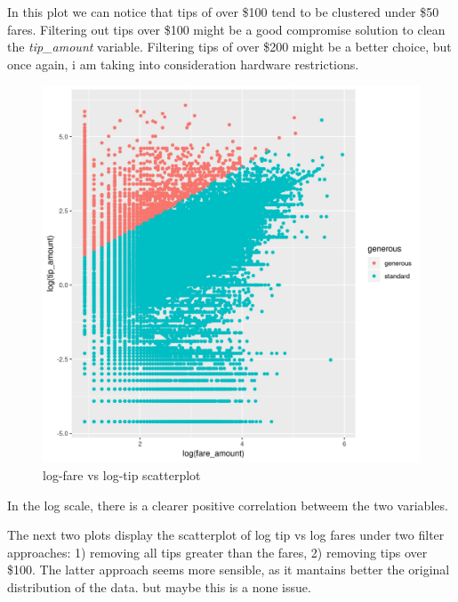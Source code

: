 \documentclass[11pt]{article}
\begin{document}
In this plot we can notice that tips of over \$100 tend to be clustered
under \$50 fares. Filtering out tips over \$100 might be a good compromise
solution to clean the \emph{tip\_amount} variable. Filtering tips of over \$200
might be a better choice, but once again, i am taking into consideration
hardware restrictions.

\begin{figure}[htbp]
\centering
\includegraphics[width=.9\linewidth]{./plots/logFareTipPlot.jpg}
\caption{\label{fig:org39ea9f5}
log-fare vs log-tip scatterplot}
\end{figure}

In the log scale, there is a clearer positive correlation betweem the two
variables.

The next two plots display the scatterplot of log tip vs log fares under two
filter approaches: 1) removing all tips greater than the fares, 2) removing
tips over \$100. The latter approach seems more sensible, as it mantains better
the original distribution of the data. but maybe this is a none issue. 
\end{document}
